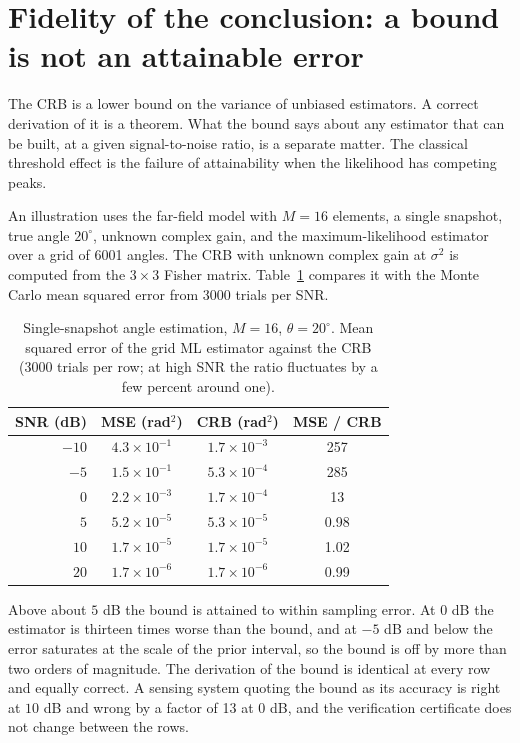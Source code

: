 \documentclass[11pt]{article}
\theoremstyle{definition}
\begin{document}
\section{Fidelity of the conclusion: a bound is not an attainable error}

The CRB is a lower bound on the variance of unbiased estimators. A correct derivation of it is a theorem. What the bound says about any estimator that can be built, at a given signal-to-noise ratio, is a separate matter. The classical threshold effect \citep[see][]{vantrees1968} is the failure of attainability when the likelihood has competing peaks.

An illustration uses the far-field model with $M=16$ elements, a single snapshot, true angle $20^\circ$, unknown complex gain, and the maximum-likelihood estimator over a grid of 6001 angles. The CRB with unknown complex gain at $\sigma^2$ is computed from the $3\times3$ Fisher matrix. Table~\ref{tab:thr} compares it with the Monte Carlo mean squared error from 3000 trials per SNR.

\begin{table}[h]
\centering
\caption{Single-snapshot angle estimation, $M=16$, $\theta=20^\circ$. Mean squared error of the grid ML estimator against the CRB (3000 trials per row; at high SNR the ratio fluctuates by a few percent around one).}
\label{tab:thr}
\begin{tabular}{rccc}
\toprule
SNR (dB) & MSE (rad$^2$) & CRB (rad$^2$) & MSE / CRB \\
\midrule
$-10$ & $4.3\times10^{-1}$ & $1.7\times10^{-3}$ & 257 \\
$-5$ & $1.5\times10^{-1}$ & $5.3\times10^{-4}$ & 285 \\
$0$ & $2.2\times10^{-3}$ & $1.7\times10^{-4}$ & 13 \\
$5$ & $5.2\times10^{-5}$ & $5.3\times10^{-5}$ & 0.98 \\
$10$ & $1.7\times10^{-5}$ & $1.7\times10^{-5}$ & 1.02 \\
$20$ & $1.7\times10^{-6}$ & $1.7\times10^{-6}$ & 0.99 \\
\bottomrule
\end{tabular}
\end{table}

Above about $5$ dB the bound is attained to within sampling error. At $0$ dB the estimator is thirteen times worse than the bound, and at $-5$ dB and below the error saturates at the scale of the prior interval, so the bound is off by more than two orders of magnitude. The derivation of the bound is identical at every row and equally correct. A sensing system quoting the bound as its accuracy is right at $10$ dB and wrong by a factor of 13 at $0$ dB, and the verification certificate does not change between the rows.
\end{document}
